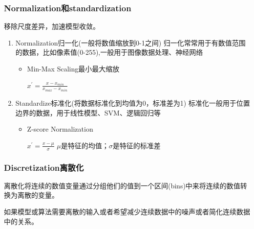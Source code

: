 \documentclass[UTF8]{ctexart}
\begin{document}
\subsubsection{Normalization和standardization}
    移除尺度差异，加速模型收敛。
    \begin{enumerate}
        \item Normalization归一化(一般将数值缩放到0-1之间)
        归一化常常用于有数值范围的数据，比如像素值(0-255),一般用于图像数据处理、神经网络
        \begin{itemize}
            \item Min-Max Scaling最小最大缩放
            
            $x^{'}=\frac{x-x_{min}}{x_{max}-x_{min}}$
            
        \end{itemize}
        \item Standardize标准化(将数据标准化到均值为0，标准差为1)
        标准化一般用于位置边界的数据，用于线性模型、SVM、逻辑回归等
        \begin{itemize}
            \item Z-score Normalization
            
            $x^{'}=\frac{x-\mu}{\sigma}$
            $\mu$是特征的均值；$\sigma$是特征的标准差
        \end{itemize}
    \end{enumerate}

\subsubsection{Discretization离散化}
离散化将连续的数值变量通过分组他们的值到一个区间(bins)中来将连续的数值转换为离散的变量。

如果模型或算法需要离散的输入或者希望减少连续数据中的噪声或者简化连续数据中的关系。
\end{document}
